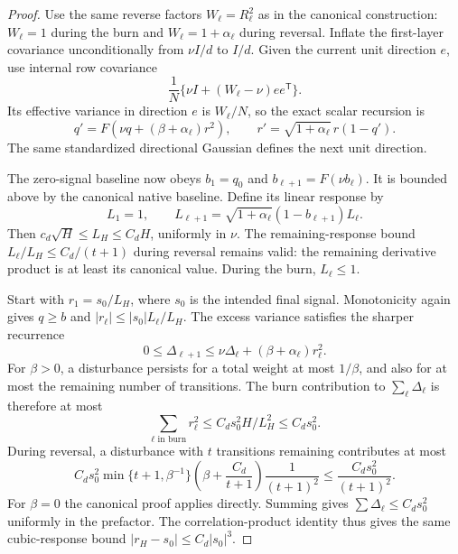\begin{proof}
Use the same reverse factors $W_\ell=R_\ell^2$ as in the canonical construction: $W_\ell=1$ during the burn and $W_\ell=1+\alpha_\ell$ during reversal. Inflate the first-layer covariance unconditionally from $\nu I/d$ to $I/d$. Given the current unit direction $e$, use internal row covariance
\[
 \frac1N\{\nu I+(W_\ell-\nu)ee^{\mathsf T}\}.
\]
Its effective variance in direction $e$ is $W_\ell/N$, so the exact scalar recursion is
\[
 q'=F(\nu q+(\beta+\alpha_\ell)r^2),\qquad
 r'=\sqrt{1+\alpha_\ell}\,r(1-q').
\]
The same standardized directional Gaussian defines the next unit direction.

The zero-signal baseline now obeys $b_1=q_0$ and $b_{\ell+1}=F(\nu b_\ell)$. It is bounded above by the canonical native baseline. Define its linear response by
\[
 L_1=1,\qquad
 L_{\ell+1}=\sqrt{1+\alpha_\ell}(1-b_{\ell+1})L_\ell.
\]
Then $c_d\sqrt H\le L_H\le C_dH$, uniformly in $\nu$. The remaining-response bound $L_\ell/L_H\le C_d/(t+1)$ during reversal remains valid: the remaining derivative product is at least its canonical value. During the burn, $L_\ell\le1$.

Start with $r_1=s_0/L_H$, where $s_0$ is the intended final signal. Monotonicity again gives $q\ge b$ and $|r_\ell|\le |s_0|L_\ell/L_H$. The excess variance satisfies the sharper recurrence
\[
 0\le\Delta_{\ell+1}\le\nu\Delta_\ell+
                       (\beta+\alpha_\ell)r_\ell^2.
\]
For $\beta>0$, a disturbance persists for a total weight at most $1/\beta$, and also for at most the remaining number of transitions. The burn contribution to $\sum_\ell\Delta_\ell$ is therefore at most
\[
 \sum_{\ell\text{ in burn}}r_\ell^2
 \le C_ds_0^2 H/L_H^2\le C_ds_0^2.
\]
During reversal, a disturbance with $t$ transitions remaining contributes at most
\[
 C_ds_0^2\min\{t+1,\beta^{-1}\}
 \left(\beta+\frac{C_d}{t+1}\right)\frac1{(t+1)^2}
 \le\frac{C_ds_0^2}{(t+1)^2}.
\]
For $\beta=0$ the canonical proof applies directly. Summing gives $\sum\Delta_\ell\le C_ds_0^2$ uniformly in the prefactor. The correlation-product identity thus gives the same cubic-response bound $|r_H-s_0|\le C_d|s_0|^3$.


\end{proof}
